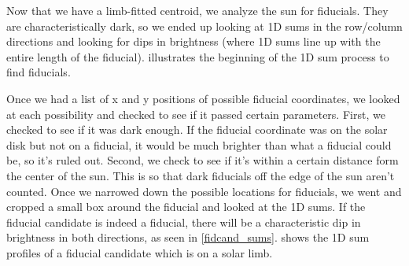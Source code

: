 \documentclass[10pt]{scrartcl}
\begin{document}
Now that we have a limb-fitted centroid, we analyze the sun for fiducials. They are characteristically dark, so we ended up looking at 1D sums in the row/column directions and looking for dips in brightness (where 1D sums line up with the entire length of the fiducial).  illustrates the beginning of the 1D sum process to find fiducials.

\begin{figure}[!ht]
\end{figure}

Once we had a list of x and y positions of possible fiducial coordinates, we looked at each possibility and checked to see if it passed certain parameters. First, we checked to see if it was dark enough. If the fiducial coordinate was on the solar disk but not on a fiducial, it would be much brighter than what a fiducial could be, so it's ruled out. Second, we check to see if it's within a certain distance form the center of the sun. This is so that dark fiducials off the edge of the sun aren't counted. Once we narrowed down the possible locations for fiducials, we went and cropped a small box around the fiducial and looked at the 1D sums. If the fiducial candidate is indeed a fiducial, there will be a characteristic dip in brightness in both directions, as seen in \cref{fidcand_sums}.  shows the 1D sum profiles of a fiducial candidate which is on a solar limb.\\%
\end{document}
